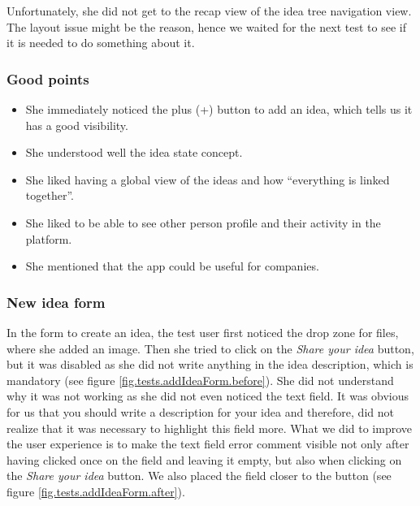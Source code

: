 \documentclass[a4paper,12pt,twoside]{article}
\begin{document}
Unfortunately, she did not get to the recap view of the idea tree navigation view.
The layout issue might be the reason, hence we waited for the next test to see if it is needed to do something about it.

\subsubsection*{Good points}
\begin{itemize}
    \item She immediately noticed the plus (+) button to add an idea, which tells us it has a good visibility.
    \item She understood well the idea state concept.
    \item She liked having a global view of the ideas and how “everything is linked together”.
    \item She liked to be able to see other person profile and their activity in the platform.
    \item She mentioned that the app could be useful for companies.
\end{itemize}

\subsubsection*{New idea form}
In the form to create an idea, the test user first noticed the drop zone for files, where she added an image.
Then she tried to click on the \emph{Share your idea} button, but it was disabled as she did not write anything in the idea description, which is mandatory (see figure \ref{fig.tests.addIdeaForm.before}).
She did not understand why it was not working as she did not even noticed the text field.
It was obvious for us that you should write a description for your idea and therefore, did not realize that it was necessary to highlight this field more.
What we did to improve the user experience is to make the text field error comment visible not only after having clicked once on the field and leaving it empty, but also when clicking on the \emph{Share your idea} button.
We also placed the field closer to the button (see figure \ref{fig.tests.addIdeaForm.after}).
\end{document}
